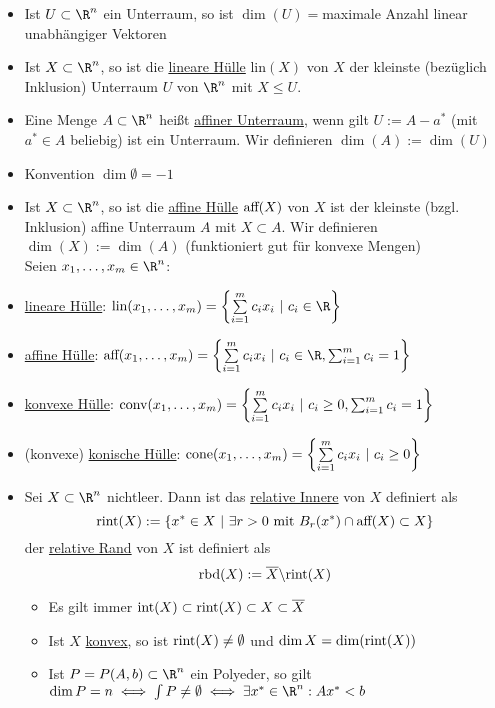 \begin{itemize}
	\item Ist $U \subset  \R^n$ ein Unterraum, so ist $\dim(U)=$maximale Anzahl linear unabhängiger Vektoren
	\item Ist $X \subset \R^n$, so ist die \underline{lineare Hülle} lin$(X)$ von $X$ der kleinste (bezüglich Inklusion) Unterraum $U$ von $\R^n$ mit $X \leq U$.
	\item Eine Menge $A \subset  \R^n$ heißt \underline{affiner Unterraum}, wenn gilt $U:=A-a^*$ (mit $a^* \in A$ beliebig) ist ein Unterraum.
		Wir definieren $\dim(A) := \dim(U)$
	\item Konvention $\dim\emptyset=-1$
	\item Ist $X\subset \R^n$, so ist die \underline{affine Hülle} $\text{aff}(X)$ von $X$ ist der kleinste (bzgl. Inklusion) affine Unterraum $A$ mit $X\subset A$.
		Wir definieren $\dim(X):=\dim(A)$ (funktioniert gut für konvexe Mengen)\\
		Seien $x_{1},\dots ,x_{m}\in\R^n$:
	\item \underline{lineare Hülle}: $\lin(x_{1},\dots ,x_{m})= \left\{ \sum\limits_{i=1}^{m} c_{i}x_{i}\ | \ c_{i}\in \R \right\}$
	\item \underline{affine Hülle}: $\aff(x_{1},\dots ,x_{m})= \left\{ \sum\limits_{i=1}^{m} c_{i}x_{i}\ | \ c_{i}\in \R, \sum_{i=1}^{m} c_{i}= 1 \right\}$
	\item \underline{konvexe Hülle}: $\text{conv}(x_{1},\dots ,x_{m})= \left\{ \sum\limits_{i=1}^{m} c_{i}x_{i}\ | \ c_{i}\geq 0, \sum_{i=1}^{m} c_{i}= 1 \right\}$
	\item (konvexe) \underline{konische Hülle}: $\text{cone}(x_{1},\dots ,x_{m})= \left\{ \sum\limits_{i=1}^{m} c_{i}x_{i}\ | \ c_{i}\geq 0 \right\}$
	\item Sei $X \subset \R^n$ nichtleer. Dann ist das \underline{relative Innere} von $X$ definiert als
		\begin{equation*}
			\text{rint}(X):= \left\{ x^* \in X \ |\ \exists r >0 \text{ mit } B_{r}(x^*)\cap\text{aff}(X) \subset X \right\}
		\end{equation*}
		der \underline{relative Rand} von $X$ ist definiert als
		\begin{equation*}
			\text{rbd}(X) := \overline{X}\backslash \text{rint}(X)
		\end{equation*}
	\begin{bemerkung}
		\begin{itemize}\
			\item Es gilt immer $\text{int}(X)\subset \text{rint}(X) \subset X \subset \overline{X}$
			\item Ist $X$ \underline{konvex}, so ist $\text{rint}(X)\neq \emptyset$ und $\dim X= \dim(\text{rint}(X))$
			\item Ist  $P = P(A,b) \subset \R^n$ ein Polyeder, so gilt $\dim P=n \iff \int P \neq \emptyset \iff \exists x^* \in \R^n: Ax^*<b$
		\end{itemize}
	\end{bemerkung}
\end{itemize}
